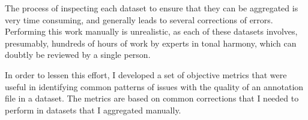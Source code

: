 
The process of inspecting each dataset to ensure that they
can be aggregated is very time consuming, and generally
leads to several corrections of errors. Performing this work
manually is unrealistic, as each of these datasets involves,
presumably, hundreds of hours of work by experts in tonal
harmony, which can doubtly be reviewed by a single person.

In order to lessen this effort, I developed a set of
objective metrics that were useful in identifying common
patterns of issues with the quality of an annotation file in
a dataset. The metrics are based on common corrections that
I needed to perform in datasets that I aggregated manually.